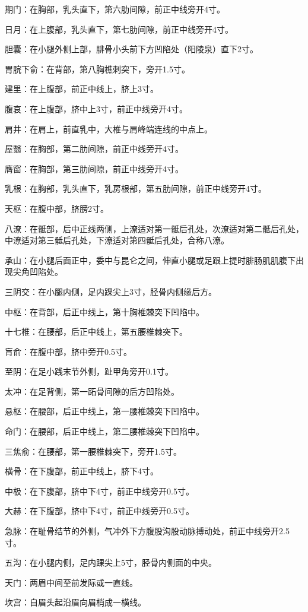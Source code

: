\documentclass[12pt,UTF8,openany]{ctexbook}
\begin{document}
期门：在胸部，乳头直下，第六肋间隙，前正中线旁开4寸。

日月：在上腹部，乳头直下，第七肋间隙，前正中线旁开4寸。

胆囊：在小腿外侧上部，腓骨小头前下方凹陷处（阳陵泉）直下2寸。

胃脘下俞：在背部，第八胸樵刺突下，旁开1.5寸。

建里：在上腹部，前正中线上，脐上3寸。

腹哀：在上腹部，脐中上3寸，前正中线旁开4寸。

肩井：在肩上，前直乳中，大椎与肩峰端连线的中点上。

屋翳：在胸部，第二肋间隙，前正中线旁开4寸。

膺窗：在胸部，第三肋间隙，前正中线旁开4寸。

乳根：在胸部，乳头直下，乳房根部，第五肋间隙，前正中线旁开4寸。

天枢：在腹中部，脐膀2寸。

八潦：在骶部，后中正线两侧，上潦适对第一骶后孔处，次潦适对第二骶后孔处，中潦适对第三骶后孔处，下潦适对第四骶后孔处，合称八潦。

承山：在小腿后面正中，委中与昆仑之间，伸直小腿或足跟上提时腓肠肌肌腹下出现尖角凹陷处。

三阴交：在小腿内侧，足内踝尖上3寸，胫骨内侧缘后方。

中枢：在背部，后正中线上，第十胸椎棘突下凹陷中。

十七椎：在腰部，后正中线上，第五腰椎棘突下。

肓俞：在腹中部，脐中旁开0.5寸。

至阴：在足小践末节外侧，趾甲角旁开0.1寸。

太冲：在足背侧，第一跖骨间隙的后方凹陷处。

悬枢：在腰部，后正中线上，第一腰椎棘突下凹陷中。

命门：在腰部，后正中线上，第二腰椎棘突下凹陷中。

三焦俞：在腰部，第一腰椎棘突下，旁开1.5寸。

横骨：在下腹部，前正中线上，脐下4寸。

中极：在下腹部，脐中下4寸，前正中线旁开0.5寸。

大赫：在下腹部，脐中下4寸，前正中线旁开0.5寸。

急脉：在耻骨结节的外侧，气冲外下方腹股沟股动脉搏动处，前正中线旁开2.5寸。

五沟：在小腿内侧，足内踝尖上5寸，胫骨内侧面的中央。

天门：两眉中间至前发际或一直线。

坎宫：自眉头起沿眉向眉梢成一横线。
\end{document}
